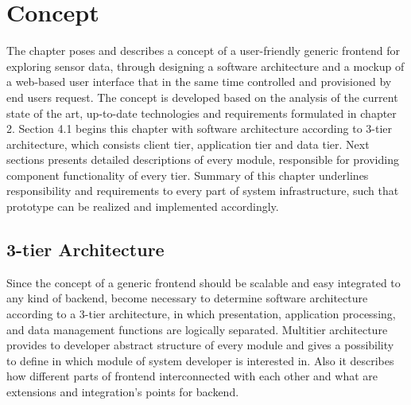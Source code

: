 \chapter{Concept}
     The chapter poses and describes a concept of a user-friendly generic frontend for exploring sensor data, 
     through designing a software architecture and a mockup of a web-based user interface that in the same time controlled and provisioned by end users request. The concept is developed based on the analysis of the current state of the art, up-to-date technologies and requirements formulated in chapter 2. 
     \newline
     Section 4.1 begins this chapter with software architecture according to 3-tier architecture, which consists client tier, application tier and data tier. Next sections presents detailed descriptions of every module, responsible for providing component functionality of every tier. Summary of this chapter underlines responsibility and requirements to every part of system infrastructure, such that prototype can be realized and implemented accordingly.


\section{3-tier Architecture}
  Since the concept of a generic frontend should be scalable and easy integrated to any kind of backend, become necessary to determine software architecture according to a 3-tier architecture, in which presentation, application processing, and data management functions are logically separated. Multitier architecture provides to developer abstract structure of every module and gives a possibility to define in which module of system developer is interested in. Also it describes how different parts of frontend interconnected with each other and what are extensions and integration's points for backend.

